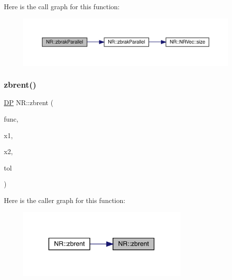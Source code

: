 Here is the call graph for this function\+:
\nopagebreak
\begin{figure}[H]
\begin{center}
\leavevmode
\includegraphics[width=350pt]{da/d46/namespaceNR_aca7c15b9ebf8da85b483508c7352938f_cgraph}
\end{center}
\end{figure}
\mbox{\label{namespaceNR_ac5818de945dc13deb3bf29c2eda04523}} 
\subsubsection{\texorpdfstring{zbrent()}{zbrent()}\hspace{0.1cm}{\footnotesize\ttfamily [1/2]}}
{\footnotesize\ttfamily \mbox{\hyperlink{namespaceNR_af6ff762dd605ff477b8e52387253a02a}{DP}} N\+R\+::zbrent (\begin{DoxyParamCaption}\item[{const \mbox{\hyperlink{classNR_1_1ScalFunc}{Scal\+Func}} \&}]{func,  }\item[{const \mbox{\hyperlink{namespaceNR_af6ff762dd605ff477b8e52387253a02a}{DP}}}]{x1,  }\item[{const \mbox{\hyperlink{namespaceNR_af6ff762dd605ff477b8e52387253a02a}{DP}}}]{x2,  }\item[{const \mbox{\hyperlink{namespaceNR_af6ff762dd605ff477b8e52387253a02a}{DP}}}]{tol }\end{DoxyParamCaption})}

Here is the caller graph for this function\+:
\nopagebreak
\begin{figure}[H]
\begin{center}
\leavevmode
\includegraphics[width=244pt]{da/d46/namespaceNR_ac5818de945dc13deb3bf29c2eda04523_icgraph}
\end{center}
\end{figure}
\mbox{\label{namespaceNR_a65e397db7c70abaac50b73cd18a8b8ae}} 

